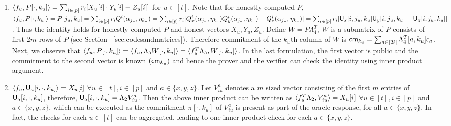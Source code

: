 \begin{enumerate}[{\rm 1.}]
	\item $\langle f_u,P[\cdot,k_u]\rangle = \sum_{i\in[p]} r_i[X_u[i]\cdot Y_u[i] - Z_u[i]]$ for $u\in[t]$. Note that for honestly computed $P$,  $\langle f_u,P[\cdot,k_u]\rangle = P[j_u,k_u] = \sum_{i\in[p]} r_i Q^i(\alpha_{j_u},\eta_{k_u}) = \sum_{i\in[p]} r_i [Q_x^i(\alpha_{j_u},\eta_{k_u}) Q_y^i(\alpha_{j_u},\eta_{k_u})- Q_z^i(\alpha_{j_u},\eta_{k_u})] = \sum_{i\in[p]} r_i [\mathsf{U}_x[i,j_u,k_u] \mathsf{U}_y[i,j_u,k_u] - \mathsf{U}_z[i,j_u,k_u]]$ . Thus the identity holds for honestly computed $P$ and honest vectors $X_u, Y_u, Z_u$. 
	Define $W = \overline{P}\Lambda_4^T$, $W$ is a submatrix of $P$ consists of first $2m$ rows of $P$ (see Section ~\ref{sec:codesandmatrices}). Therefore commitment of the $k_u$th column of $W$ is $\mathsf{cm}_{k_u} = \sum_{a\in[2\ell]} \Lambda_4^T[a,k_u]c_a$. Next, we observe that $\langle f_u,P[\cdot,k_u]\rangle = \langle f_u,\Lambda_5 W[\cdot,k_u]\rangle = \langle f_u^T\Lambda_5,W[\cdot,k_u]\rangle$. In the last formulation, the first vector is public and the commitment to the second vector is known $(\mathsf{cm}_{k_u})$ and hence the prover and the verifier can check the identity using inner product argument.
	
	\item $\langle f_u,\mathsf{U}_a[i,\cdot,k_u]\rangle = X_u[i]$ $\forall u\in[t], i\in[p]$ and $a\in\{x,y,z\}$. Let $V^a_{iu}$ denotes a $m$ sized vector consisting of the first $m$ entries of $\mathsf{U}_a[i,\cdot, k_u]$, therefore, $\mathsf{U}_a[i,\cdot,k_u] = \Lambda_2 V^a_{iu}$. Then the above inner product can be written as $\langle f_u^T \Lambda_2,V^a_{iu}\rangle = X_u[i]$ $\forall u\in[t], i\in[p]$ and $a\in\{x,y,z\}$, which can be executed as the commitment $\pi[\cdot,k_u]$ of $V^a_{iu}$ is present as part of the oracle response, for all $a\in \{x,y,z\}$. In fact, the checks for each $u\in [t]$ can be aggregated, leading to one inner product check for each $a\in \{x,y,z\}$.
\end{enumerate}




